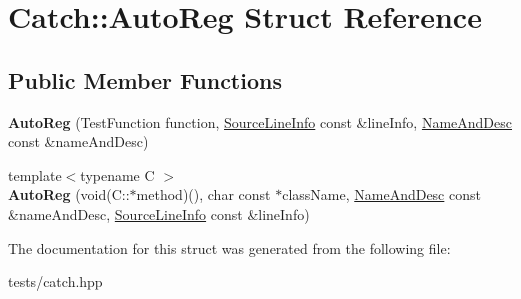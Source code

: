 \hypertarget{struct_catch_1_1_auto_reg}{}\section{Catch\+:\+:Auto\+Reg Struct Reference}
\label{struct_catch_1_1_auto_reg}
\subsection*{Public Member Functions}
\begin{DoxyCompactItemize}
\item 
\mbox{\label{struct_catch_1_1_auto_reg_af224f4568d57b8652474df475a164a8c}} 
{\bfseries Auto\+Reg} (Test\+Function function, \hyperlink{struct_catch_1_1_source_line_info}{Source\+Line\+Info} const \&line\+Info, \hyperlink{struct_catch_1_1_name_and_desc}{Name\+And\+Desc} const \&name\+And\+Desc)
\item 
\mbox{\label{struct_catch_1_1_auto_reg_a1bf9207fe0a02b46dc0ab1cc03cbe738}} 
{\footnotesize template$<$typename C $>$ }\\{\bfseries Auto\+Reg} (void(C\+::$\ast$method)(), char const $\ast$class\+Name, \hyperlink{struct_catch_1_1_name_and_desc}{Name\+And\+Desc} const \&name\+And\+Desc, \hyperlink{struct_catch_1_1_source_line_info}{Source\+Line\+Info} const \&line\+Info)
\end{DoxyCompactItemize}


The documentation for this struct was generated from the following file\+:\begin{DoxyCompactItemize}
\item 
tests/catch.\+hpp\end{DoxyCompactItemize}
